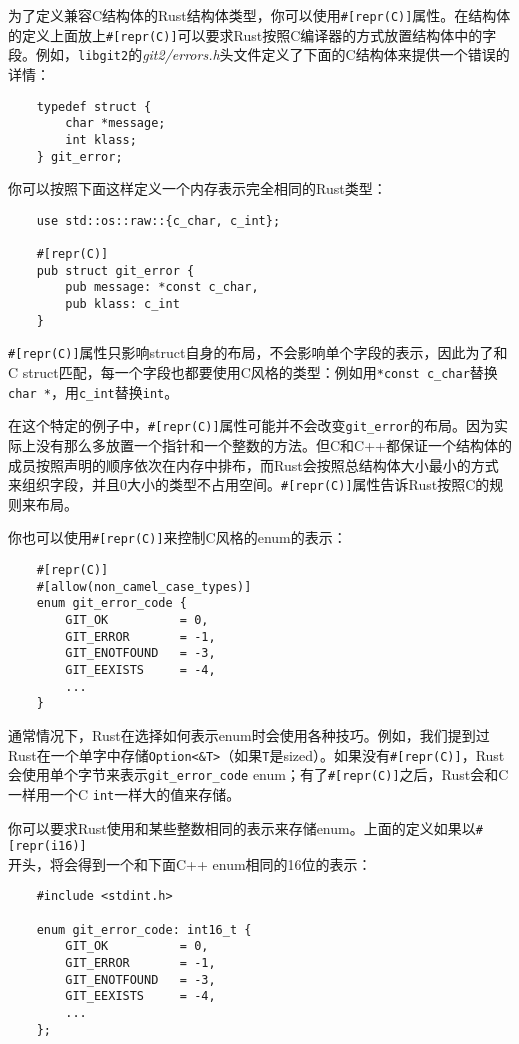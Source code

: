为了定义兼容C结构体的Rust结构体类型，你可以使用\texttt{\#[repr(C)]}属性。在结构体的定义上面放上\texttt{\#[repr(C)]}可以要求Rust按照C编译器的方式放置结构体中的字段。例如，\texttt{libgit2}的\emph{git2/errors.h}头文件定义了下面的C结构体来提供一个错误的详情：
\begin{verbatim}
    typedef struct {
        char *message;
        int klass;
    } git_error;
\end{verbatim}

你可以按照下面这样定义一个内存表示完全相同的Rust类型：
\begin{verbatim}
    use std::os::raw::{c_char, c_int};

    #[repr(C)]
    pub struct git_error {
        pub message: *const c_char,
        pub klass: c_int
    }
\end{verbatim}

\texttt{\#[repr(C)]}属性只影响struct自身的布局，不会影响单个字段的表示，因此为了和C struct匹配，每一个字段也都要使用C风格的类型：例如用\texttt{*const c\_char}替换\texttt{char *}，用\texttt{c\_int}替换\texttt{int}。

在这个特定的例子中，\texttt{\#[repr(C)]}属性可能并不会改变\texttt{git\_error}的布局。因为实际上没有那么多放置一个指针和一个整数的方法。但C和C++都保证一个结构体的成员按照声明的顺序依次在内存中排布，而Rust会按照总结构体大小最小的方式来组织字段，并且0大小的类型不占用空间。\texttt{\#[repr(C)]}属性告诉Rust按照C的规则来布局。

你也可以使用\texttt{\#[repr(C)]}来控制C风格的enum的表示：
\begin{verbatim}
    #[repr(C)]
    #[allow(non_camel_case_types)]
    enum git_error_code {
        GIT_OK          = 0,
        GIT_ERROR       = -1,
        GIT_ENOTFOUND   = -3,
        GIT_EEXISTS     = -4,
        ...
    }
\end{verbatim}

通常情况下，Rust在选择如何表示enum时会使用各种技巧。例如，我们提到过Rust在一个单字中存储\texttt{Option<\&T>}（如果\texttt{T}是sized）。如果没有\texttt{\#[repr(C)]}，Rust会使用单个字节来表示\texttt{git\_error\_code} enum；有了\texttt{\#[repr(C)]}之后，Rust会和C一样用一个C \texttt{int}一样大的值来存储。

你可以要求Rust使用和某些整数相同的表示来存储enum。上面的定义如果以\texttt{\#[repr(i16)]}\\
开头，将会得到一个和下面C++ enum相同的16位的表示：
\begin{verbatim}
    #include <stdint.h>

    enum git_error_code: int16_t {
        GIT_OK          = 0,
        GIT_ERROR       = -1,
        GIT_ENOTFOUND   = -3,
        GIT_EEXISTS     = -4,
        ...
    };
\end{verbatim}

